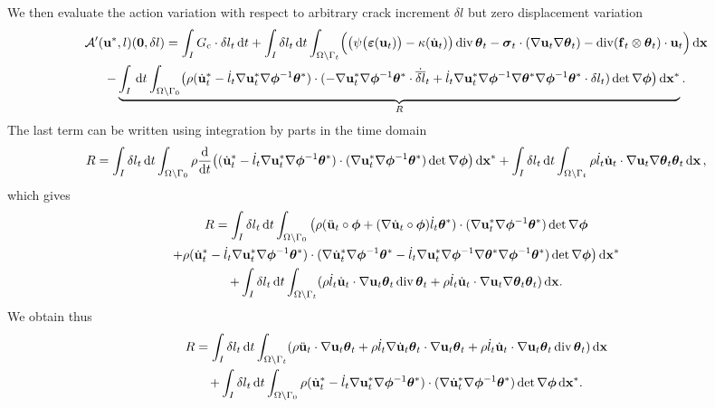 We then evaluate the action variation with respect to arbitrary crack increment $\delta l$ but zero displacement variation
\begin{multline} \label{eq:aprime3}
\mathcal{A}'(\vec{u}^*,l)(\vec{0},\delta l)=\int_I\gc\cdot\delta l_t\D{t}+\int_I\delta l_t\D{t}\int_\domaint\Bigl(\bigl(\psi\bigl(\eps(\vec{u}_t)\bigr)-\kappa(\dot{\vec{u}}_t)\bigr)\div\vtheta_t-\sig_t\cdot(\nabla\vec{u}_t\nabla\vtheta_t)-\div(\vec{f}_t\otimes\vtheta_t)\cdot\vec{u}_t\Bigr)\dx \\
-\underbrace{\int_I\D{t}\int_\domaini\bigl(\rho(\dot{\vec{u}}^*_t-\dot{l}_t\nabla\vec{u}^*_t\nabla\philt^{-1}\vtheta^*)\cdot(-\nabla\vec{u}_t^*\nabla\philt^{-1}\vtheta^*\cdot\dot{\overline{\delta l}}_t+\dot{l}_t\nabla\vec{u}_t^*\nabla\philt^{-1}\nabla\vtheta^*\nabla\philt^{-1}\vtheta^*\cdot\delta l_t)\det\nabla\philt\bigr)\dxx}_R.
\end{multline}
The last term can be written using integration by parts in the time domain
\[
R=\int_I\delta l_t\D{t}\int_\domaini\rho\frac{\md}{\md t}\bigl((\dot{\vec{u}}^*_t-\dot{l}_t\nabla\vec{u}^*_t\nabla\philt^{-1}\vtheta^*)\cdot(\nabla\vec{u}_t^*\nabla\philt^{-1}\vtheta^*)\det\nabla\philt\bigr)\dxx+\int_I\delta l_t\D{t}\int_\domaint\rho\dot{l}_t\dot{\vec{u}}_t\cdot\nabla\vec{u}_t\nabla\vtheta_t\vtheta_t\dx\,,
\]
which gives
\begin{multline*}
R=\int_I\delta l_t\D{t}\int_\domaini\big(\rho(\ddot{\vec{u}}_t\circ\philt+(\nabla\dot{\vec{u}}_t\circ\philt)\dot{l}_t\vtheta^*)\cdot(\nabla\vec{u}_t^*\nabla\philt^{-1}\vtheta^*)\det\nabla\philt \\
+\rho(\dot{\vec{u}}^*_t-\dot{l}_t\nabla\vec{u}^*_t\nabla\philt^{-1}\vtheta^*)\cdot(\nabla\dot{\vec{u}}^*_t\nabla\philt^{-1}\vtheta^*-\dot{l}_t\nabla\vec{u}^*_t\nabla\philt^{-1}\nabla\vtheta^*\nabla\philt^{-1}\vtheta^*)\det\nabla\philt\big)\dxx \\
+\int_I\delta l_t\D{t}\int_\domaint(\rho\dot{l}_t\dot{\vec{u}}_t\cdot\nabla\vec{u}_t\vtheta_t\div\vtheta_t+\rho\dot{l}_t\dot{\vec{u}}_t\cdot\nabla\vec{u}_t\nabla\vtheta_t\vtheta_t)\dx.
\end{multline*}
We obtain thus
\begin{multline*}
R=\int_I\delta l_t\D{t}\int_\domaint(\rho\ddot{\vec{u}}_t\cdot\nabla\vec{u}_t\vtheta_t+\rho\dot{l}_t\nabla\dot{\vec{u}}_t\vtheta_t\cdot\nabla\vec{u}_t\vtheta_t+\rho\dot{l}_t\dot{\vec{u}}_t\cdot\nabla\vec{u}_t\vtheta_t\div\vtheta_t)\dx \\
+\int_I\delta l_t\D{t}\int_\domaini\rho(\dot{\vec{u}}^*_t-\dot{l}_t\nabla\vec{u}^*_t\nabla\philt^{-1}\vtheta^*)\cdot(\nabla\dot{\vec{u}}^*_t\nabla\philt^{-1}\vtheta^*)\det\nabla\philt\dxx.
\end{multline*}
